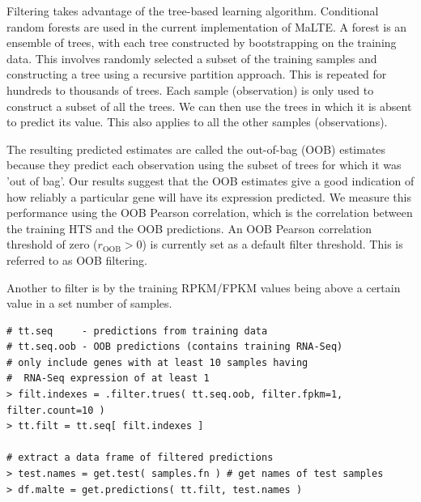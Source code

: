 \documentclass[a4paper,12pt]{article}
\begin{document}
Filtering takes advantage of the tree-based learning algorithm. Conditional random forests are used in the current implementation of \textsf{MaLTE}. A forest is an ensemble of trees, with each tree constructed by bootstrapping on the training data. This involves randomly selected a subset of the training samples and constructing a tree using a recursive partition approach. This is repeated for hundreds to thousands of trees. Each sample (observation) is only used to construct a subset of all the trees. We can then use the trees in which it is absent to predict its value. This also applies to all the other samples (observations).

The resulting predicted estimates are called the out-of-bag (OOB) estimates because they predict each observation using the subset of trees for which it was 'out of bag'. Our results suggest that the OOB estimates give a good indication of how reliably a particular gene will have its expression predicted. We measure this performance using the OOB Pearson correlation, which is the correlation between the training HTS and the OOB predictions. An OOB Pearson correlation threshold of zero ($r_{\mathrm{OOB}} > 0$) is currently set as a default filter threshold. This is referred to as OOB filtering.

Another to filter is by the training RPKM/FPKM values being above a certain value in a set number of samples.

\begin{verbatim}
# tt.seq     - predictions from training data 
# tt.seq.oob - OOB predictions (contains training RNA-Seq)
# only include genes with at least 10 samples having
#  RNA-Seq expression of at least 1
> filt.indexes = .filter.trues( tt.seq.oob, filter.fpkm=1, filter.count=10 )
> tt.filt = tt.seq[ filt.indexes ]

# extract a data frame of filtered predictions
> test.names = get.test( samples.fn ) # get names of test samples
> df.malte = get.predictions( tt.filt, test.names )
\end{verbatim}
\end{document}

